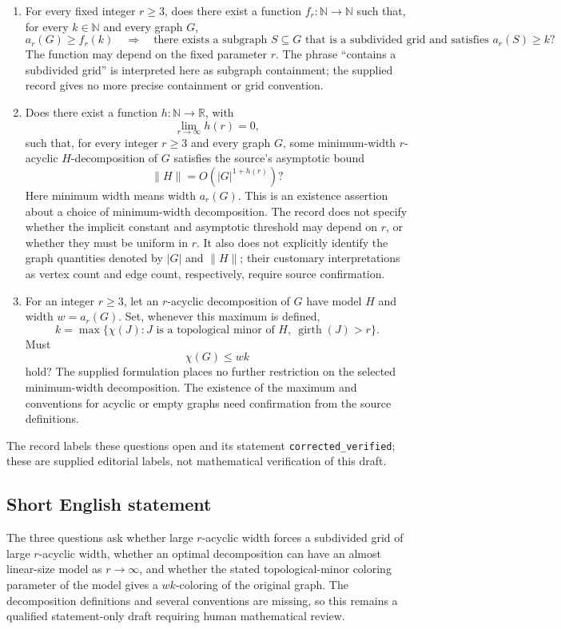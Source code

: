 \documentclass[11pt]{article}
\newcommand{\N}{\mathbb{N}}
\newcommand{\R}{\mathbb{R}}
\begin{document}
\begin{enumerate}
\item For every fixed integer \(r\geq 3\), does there exist a function \(f_r:\N\to\N\) such that, for every \(k\in\N\) and every graph \(G\),
\[
 a_r(G)\geq f_r(k)
 \quad\Longrightarrow\quad
 \text{there exists a subgraph }S\subseteq G
 \text{ that is a subdivided grid and satisfies }a_r(S)\geq k?
\]
The function may depend on the fixed parameter \(r\). The phrase ``contains a subdivided grid'' is interpreted here as subgraph containment; the supplied record gives no more precise containment or grid convention.

\item Does there exist a function \(h:\N\to\R\), with
\[
 \lim_{r\to\infty}h(r)=0,
\]
such that, for every integer \(r\geq3\) and every graph \(G\), some minimum-width \(r\)-acyclic \(H\)-decomposition of \(G\) satisfies the source's asymptotic bound
\[
 \lVert H\rVert=O\!\left(|G|^{1+h(r)}\right)?
\]
Here minimum width means width \(a_r(G)\). This is an existence assertion about a choice of minimum-width decomposition. The record does not specify whether the implicit constant and asymptotic threshold may depend on \(r\), or whether they must be uniform in \(r\). It also does not explicitly identify the graph quantities denoted by \(|G|\) and \(\lVert H\rVert\); their customary interpretations as vertex count and edge count, respectively, require source confirmation.

\item For an integer \(r\geq3\), let an \(r\)-acyclic decomposition of \(G\) have model \(H\) and width \(w=a_r(G)\). Set, whenever this maximum is defined,
\[
 k=\max\bigl\{\chi(J): J\text{ is a topological minor of }H,
                   \ \operatorname{girth}(J)>r\bigr\}.
\]
Must
\[
 \chi(G)\leq wk
\]
hold? The supplied formulation places no further restriction on the selected minimum-width decomposition. The existence of the maximum and conventions for acyclic or empty graphs need confirmation from the source definitions.
\end{enumerate}

The record labels these questions open and its statement \texttt{corrected\_verified}; these are supplied editorial labels, not mathematical verification of this draft.
\subsection{Short English statement}
The three questions ask whether large \(r\)-acyclic width forces a subdivided grid of large \(r\)-acyclic width, whether an optimal decomposition can have an almost linear-size model as \(r\to\infty\), and whether the stated topological-minor coloring parameter of the model gives a \(wk\)-coloring of the original graph. The decomposition definitions and several conventions are missing, so this remains a qualified statement-only draft requiring human mathematical review.
\end{document}
